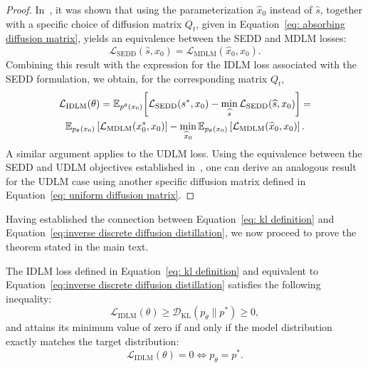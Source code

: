         \begin{proof}
            In~\citet[Appendix C]{sahoo2024simple}, it was shown that using the parameterization $\widehat{x}_0$ instead of $\widehat{s}$, together with a specific choice of diffusion matrix $Q_t$, given in Equation~\eqref{eq: absorbing diffusion matrix}, yields an equivalence between the SEDD and MDLM losses:
            $$ \mathcal{L}_{\text{SEDD}}(\widehat{s}, x_0) = \mathcal{L}_{\text{MDLM}}(\widehat{x}_0, x_0).$$
            Combining this result with the expression for the IDLM loss associated with the SEDD formulation, we obtain, for the corresponding matrix $Q_t$,
            \begin{gather}
                \mathcal{L}_{\text{IDLM}}(\theta) = \mathbb{E}_{p^{\theta}(x_0)} \biggl[\mathcal{L}_{\text{SEDD}}(s^*, x_0) - \min_{\widehat{s}} \mathcal{L}_{\text{SEDD}}(\widehat{s}, x_0)\biggr] = \nonumber \\ \mathbb{E}_{ p_{\theta}(x_0)} \left[\mathcal{L}_{\text{MDLM}}(x_0^*, x_0)\right]
            - \min_{\widehat{x}_0} \mathbb{E}_{ p_{\theta}(x_0)} \left[\mathcal{L}_{\text{MDLM}}(\widehat{x}_0, x_0)\right].
            \end{gather}
            A similar argument applies to the UDLM loss. Using the equivalence between the SEDD and UDLM objectives established in~\citet[Appendix B]{schiff2024discreteguidance}, one can derive an analogous result for the UDLM case using another specific diffusion matrix defined in Equation~\eqref{eq: uniform diffusion matrix}.
        \end{proof}
        Having established the connection between Equation~\eqref{eq: kl definition} and Equation~\eqref{eq:inverse discrete diffusion distillation}, we now proceed to prove the theorem stated in the main text.
        \begin{theorem}
            The IDLM loss defined in Equation~\eqref{eq: kl definition} and equivalent to Equation~\eqref{eq:inverse discrete diffusion distillation} satisfies the following inequality:
            \begin{equation}
            \mathcal{L}_{\text{IDLM}}(\theta) \geq
            \mathcal{D}_{\text{KL}}(p_{\theta} \parallel p^*) \geq 0,
            \end{equation}
            and attains its minimum value of zero if and only if the model distribution exactly matches the target distribution:
            \begin{equation}
            \mathcal{L}_{\text{IDLM}}(\theta) = 0 \iff p_{\theta} = p^*.
            \end{equation}
        \end{theorem}
